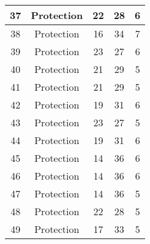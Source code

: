 \documentclass[results.tex]{subfiles}
\begin{document}
\begin{center}
\begin{tabular}{| c || c | c | c | c |}
            \hline
            37                      & Protection                   & 22                     & 28                      & 6                    \\
            \hline
            38                      & Protection                   & 16                     & 34                      & 7                    \\
            \hline
            39                      & Protection                   & 23                     & 27                      & 6                    \\
            \hline
            40                      & Protection                   & 21                     & 29                      & 5                    \\
            \hline
            41                      & Protection                   & 21                     & 29                      & 5                    \\
            \hline
            42                      & Protection                   & 19                     & 31                      & 6                    \\
            \hline
            43                      & Protection                   & 23                     & 27                      & 5                    \\
            \hline
            44                      & Protection                   & 19                     & 31                      & 6                    \\
            \hline
            45                      & Protection                   & 14                     & 36                      & 6                    \\
            \hline
            46                      & Protection                   & 14                     & 36                      & 6                    \\
            \hline
            47                      & Protection                   & 14                     & 36                      & 5                    \\
            \hline
            48                      & Protection                   & 22                     & 28                      & 5                    \\
            \hline
            49                      & Protection                   & 17                     & 33                      & 5                    \\
            \hline
        \end{tabular}
    \end{center}
\end{document}
